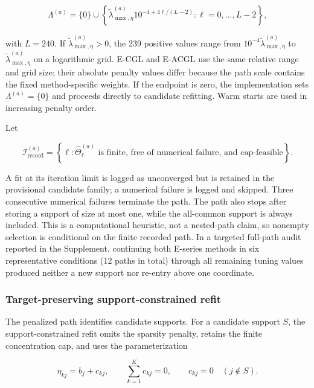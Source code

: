\documentclass[preprint,12pt,authoryear]{elsarticle}
\begin{document}
\begin{equation}
\label{eq:lambda-path}
\Lambda^{(a)}
=\{0\}\cup
\left\{
\widetilde\lambda_{\max,\eta}^{(a)}
10^{-4+4\ell/(L-2)}:
\ell=0,\ldots,L-2
\right\},
\end{equation}

with $L=240$. If $\widetilde\lambda_{\max,\eta}^{(a)}>0$, the 239 positive
values range from
$10^{-4}\widetilde\lambda_{\max,\eta}^{(a)}$ to
$\widetilde\lambda_{\max,\eta}^{(a)}$ on a logarithmic grid. E-CGL and
E-ACGL use the same relative range and grid size; their absolute penalty
values differ because the path scale contains the fixed method-specific
weights. If the endpoint is zero, the implementation sets
$\Lambda^{(a)}=\{0\}$ and proceeds directly to candidate refitting. Warm starts
are used in increasing penalty order.

Let

\[
\mathcal I_{\mathrm{record}}^{(a)}
=\left\{\ell:
\widehat\Theta_{\ell}^{(a)}\text{ is finite, free of numerical failure, and cap-feasible}
\right\}.
\]

A fit at its iteration limit is logged as unconverged but is retained in the
provisional candidate family; a numerical failure is logged and skipped.
Three consecutive numerical failures terminate the path.
The path also stops after storing a support of size at most one, while the
all-common support is always included. This is a computational heuristic, not
a nested-path claim, so nonempty selection is conditional on the finite
recorded path. In a targeted full-path audit reported in the Supplement,
continuing both E-series methods in six representative conditions (12 paths
in total) through all remaining tuning values produced neither a new support
nor re-entry above one coordinate.

\subsubsection{Target-preserving support-constrained refit}

The penalized path identifies candidate supports. For a candidate support $S$,
the support-constrained refit omits the sparsity penalty, retains the finite
concentration cap, and uses the parameterization

\begin{equation}
\label{eq:refit-parameterization}
\eta_{kj}=b_j+c_{kj},
\qquad
\sum_{k=1}^K c_{kj}=0,
\qquad
c_{kj}=0\quad(j\notin S).
\end{equation}
\end{document}
